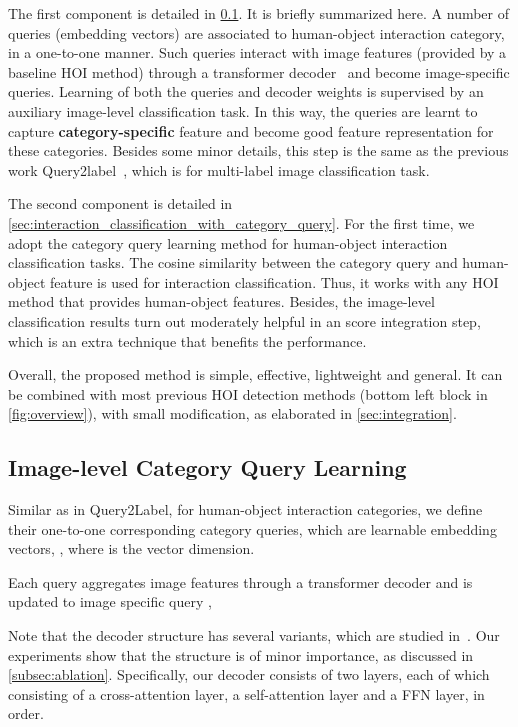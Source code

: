 \documentclass[10pt,twocolumn,letterpaper]{article}
\begin{document}
The first component is detailed in \cref{sec:category_query_learning}. It is briefly summarized here. A number of queries (embedding vectors) are associated to human-object interaction category, in a one-to-one manner. Such queries interact with image features (provided by a baseline HOI method) through a transformer decoder~\cite{vaswani2017attention} and become image-specific queries. Learning of both the queries and decoder weights is supervised by an auxiliary image-level classification task. In this way, the queries are learnt to capture \textbf{category-specific} feature and become good feature representation for these categories. Besides some minor details, this step is the same as the previous work Query2label~\cite{liu2021query2label}, which is for multi-label image classification task.



The second component is detailed in \cref{sec:interaction_classification_with_category_query}. For the first time, we adopt the category query learning method for human-object interaction classification tasks. The cosine similarity between the category query and human-object feature is used for interaction classification. Thus, it works with any HOI method that provides human-object features. Besides, the image-level classification results turn out moderately helpful in an score integration step, which is an extra technique that benefits the performance.

Overall, the proposed method is simple, effective, lightweight and general. It can be combined with most previous HOI detection methods (bottom left block in \cref{fig:overview}), with small modification, as elaborated in \cref{sec:integration}.

\subsection{Image-level Category Query Learning}
\label{sec:category_query_learning}
Similar as in Query2Label\cite{liu2021query2label}, for  human-object interaction categories, we define their one-to-one corresponding category queries, which are learnable embedding vectors, , where  is the vector dimension. 

Each query  aggregates image features  through a transformer decoder and is updated to image specific query ,


Note that the decoder structure has several variants, which are studied in~\cite{cheng2022mask2former}. Our experiments show that the structure is of minor importance, as discussed in \cref{subsec:ablation}. Specifically, our decoder consists of two layers, each of which consisting of a cross-attention layer, a self-attention layer and a FFN layer, in order.
\end{document}
